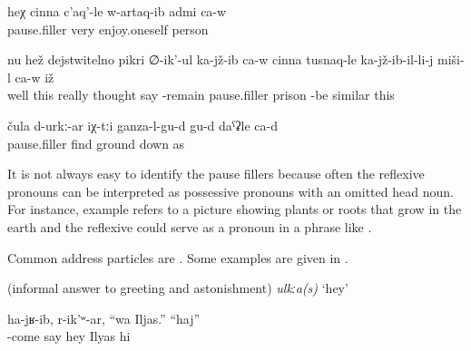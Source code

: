 \begin{exe}
	\ex	\label{ex:He is a person that is very extroverted minor@7a}
	\gll	heχ	cinna	c'aq'-le	w-artaq-ib	admi	ca-w\\
			pause.filler	very	enjoy.oneself	person	\\
	\glt	{}

	\ex	\label{ex:‎He is really thinking (or worrying), and sitting, it looks like he is in prison minor}
	\gll	nu	hež	dejstwitelno	pikri	∅-ik'-ul	ka-jž-ib	ca-w	cinna		tusnaq-le	ka-jž-ib-il-li-j	miši-l	ca-w	iž\\
		well	this	really	thought	say	-remain		pause.filler	prison	-be	similar		this\\
	\glt	{}

	\ex	\label{ex:Well, probably they are like under the ground (growing) minor@7b}
	\gll	čula	d-urkː-ar	iχ-tːi	ganza-l-gu-d	gu-d	daˁʡle	ca-d\\
		pause.filler	find		ground	down	as	\\
	\glt	{}
\end{exe}

It is not always easy to identify the pause fillers because often the reflexive pronouns can be interpreted as possessive pronouns with an omitted head noun. For instance, example  refers to a picture showing plants or roots that grow in the earth and the reflexive  could serve as a pronoun in a phrase like .

Common address particles are . Some examples are given in .

\begin{exe}
	\ex	\label{ex:pause fillers interjections minor}
	\begin{xlist}
		\ex	{} 	
		\ex	{}  (informal answer to greeting and astonishment)	
		\ex	{} 	
		\ex \textit{ulkːa(s)} `hey'
		\ex	{} 	
	\end{xlist}

	\ex	\label{ex:‎He came, and she said (to him), Hey Iljas. (He said), Hi minor}
	\gll	ha-jʁ-ib,	r-ik'ʷ-ar,	``wa	Iljas.''	``haj''\\
		-come	say	hey	Ilyas		hi\\
	\glt	{}

\end{exe}

